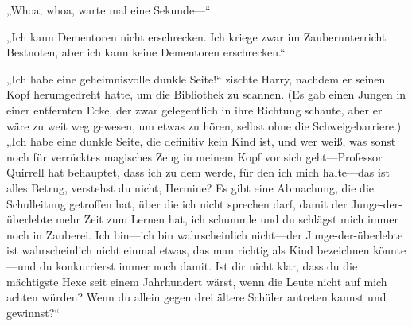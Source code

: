„Whoa, whoa, warte mal eine Sekunde—“

„Ich kann Dementoren nicht erschrecken. Ich kriege zwar im Zauberunterricht Bestnoten, aber ich kann keine Dementoren erschrecken.“

„Ich habe eine geheimnisvolle dunkle Seite!“ zischte Harry, nachdem er seinen Kopf herumgedreht hatte, um die Bibliothek zu scannen. (Es gab einen Jungen in einer entfernten Ecke, der zwar gelegentlich in ihre Richtung schaute, aber er wäre zu weit weg gewesen, um etwas zu hören, selbst ohne die Schweigebarriere.) „Ich habe eine dunkle Seite, die definitiv kein Kind ist, und wer weiß, was sonst noch für verrücktes magisches Zeug in meinem Kopf vor sich geht—Professor Quirrell hat behauptet, dass ich zu dem werde, für den ich mich halte—das ist alles Betrug, verstehst du nicht, Hermine? Es gibt eine Abmachung, die die Schulleitung getroffen hat, über die ich nicht sprechen darf, damit der Junge-der-überlebte mehr Zeit zum Lernen hat, ich schummle und du schlägst mich immer noch in Zauberei. Ich bin—ich bin wahrscheinlich nicht—der Junge-der-überlebte ist wahrscheinlich nicht einmal etwas, das man richtig als Kind bezeichnen könnte—und du konkurrierst immer noch damit. Ist dir nicht klar, dass du die mächtigste Hexe seit einem Jahrhundert wärst, wenn die Leute nicht auf mich achten würden? Wenn du allein gegen drei ältere Schüler antreten kannst und gewinnst?“

